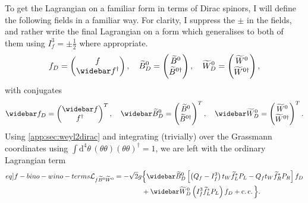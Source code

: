 \documentclass[english, notitlepage]{article}
\begin{document}
To get the Lagrangian on a familiar form in terms of Dirac spinors, I will
define the following fields in a familiar way. For clarity, I suppress the
\(\pm\) in the fields, and rather write the final Lagrangian on a form which
generalises to both of them using \(I^3_f = \pm \frac{1}{2}\) where
appropriate.
\begin{align}
    f_D = \begin{pmatrix}
              f \\ \wbar{f}^\dagger
          \end{pmatrix},
    \quad
    \wtilde{B}^0_D = \begin{pmatrix}
                         \wtilde{B}^0 \\ \wtilde{B}^{0 \dagger}
                     \end{pmatrix},
    \quad
    \wtilde{W}^0_D = \begin{pmatrix}
                         \wtilde{W}^0 \\ \wtilde{W}^{0 \dagger}
                     \end{pmatrix},
\end{align}
with conjugates
\begin{align}
    \wbar{f}_D = \begin{pmatrix}
                     \wbar{f} \\ f^\dagger
                 \end{pmatrix}^T,
    \quad
    \wbar{\wtilde{B}}^0_D = \begin{pmatrix}
                                \wtilde{B}^0 \\ \wtilde{B}^{0 \dagger}
                            \end{pmatrix}^T,
    \quad
    \wbar{\wtilde{W}}^0_D = \begin{pmatrix}
                                \wtilde{W}^0 \\ \wtilde{W}^{0 \dagger}
                            \end{pmatrix}^T.
\end{align}
Using \cref{app:sec:weyl2dirac} and integrating (trivially) over the Grassmann
coordinates using \(\int \! \mathrm{d}^4 \theta
\,(\theta\theta)(\theta\theta)^\dagger = 1\), we are left with the ordinary
Lagrangian term
\begin{align}
    \label[eq]{f-bino-wino-terms}
    \nonumber
    \L_{f\bino\wino} = -\sqrt{2} g & \Big\{ \wbar{\wtilde{B}}^0_D \bclosed{
        \pclosed{Q_f - I^3_f} t_W \wtilde{f}_L^\ast P_L - Q_f t_W
        \wtilde{f}_R^\ast P_R
    } f_D                                                                   \\
                                   & + \wbar{\wtilde{W}}^0_D \pclosed{I^3_f
        \wtilde{f}_L^\ast P_L} f_D + \cc \Big\}.
\end{align}
\end{document}
